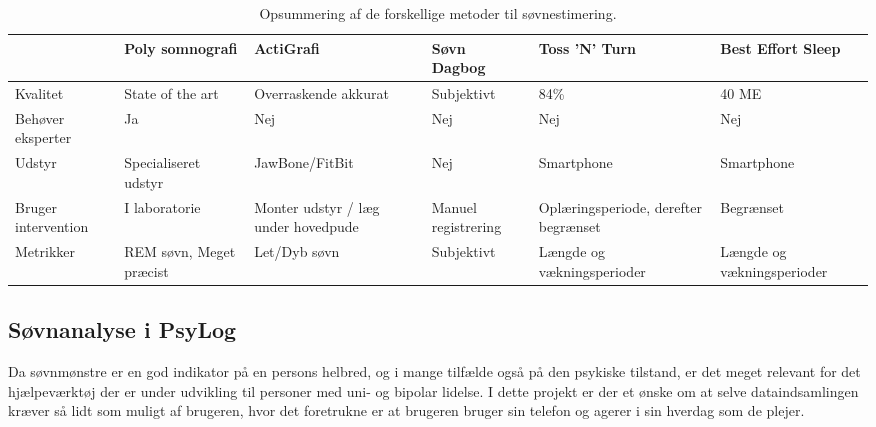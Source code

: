 \begin{table}[h]
\begin{tabular}{|p{1.5cm}|p{2cm}|p{3cm}|p{2cm}|p{3cm}|p{2cm}|}
\hline                    	& Poly somnografi      		& ActiGrafi                           & Søvn Dagbog          & Toss 'N' Turn                        & Best Effort Sleep \\ 
\hline Kvalitet           	& State of the art			& Overraskende akkurat                & Subjektivt           & 84\%   		& 40 ME \\ 
\hline Behøver eksperter   	& Ja						& Nej                                 & Nej                  & Nej    		& Nej \\ 
\hline Udstyr              	& Specialiseret udstyr		& JawBone/FitBit                      & Nej                  & Smartphone   & Smartphone \\ 
\hline Bruger intervention 	& I laboratorie	& Monter udstyr / læg under hovedpude & Manuel registrering  & Oplæringsperiode, derefter begrænset & Begrænset \\ 
\hline Metrikker           	& REM søvn, Meget præcist	& Let/Dyb søvn                        & Subjektivt           & Længde og vækningsperioder & Længde og vækningsperioder \\ 
\hline 
\end{tabular}
\caption{Opsummering af de forskellige metoder til søvnestimering.}
\label{tab:opsummeringMetoder}
\end{table}

\subsection{Søvnanalyse i PsyLog}
Da søvnmønstre er en god indikator på en persons helbred, og i mange tilfælde også på den psykiske tilstand, er det meget relevant for det hjælpeværktøj der er under udvikling til personer med uni- og bipolar lidelse.
I dette projekt er der et ønske om at selve dataindsamlingen kræver så lidt som muligt af brugeren, hvor det foretrukne er at brugeren bruger sin telefon og agerer i sin hverdag som de plejer.

